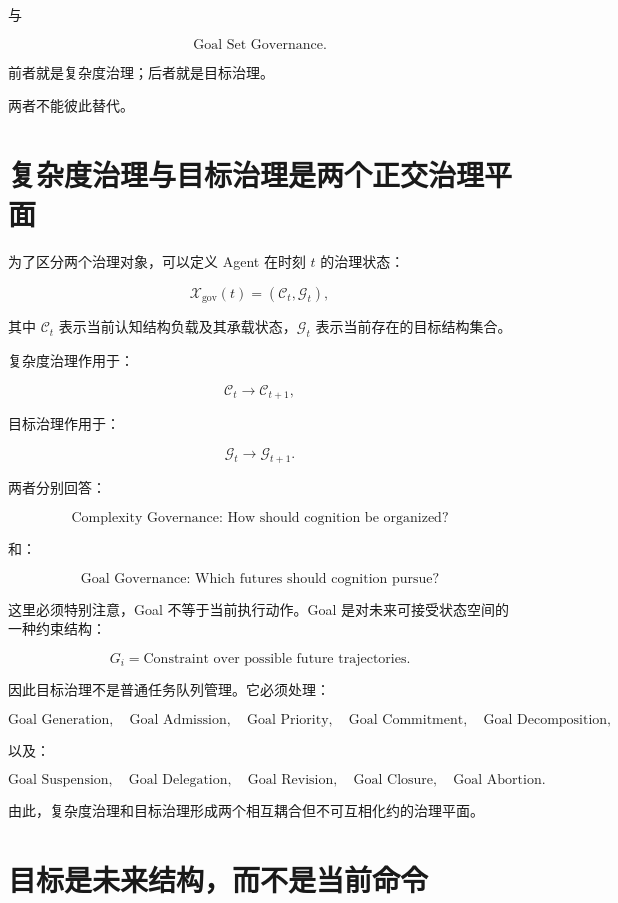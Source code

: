 与

\[
\boxed{
\text{Goal Set Governance}.
}
\]

前者就是复杂度治理；后者就是目标治理。

两者不能彼此替代。


\section{复杂度治理与目标治理是两个正交治理平面}

为了区分两个治理对象，可以定义 Agent 在时刻 $t$ 的治理状态：

\[
\boxed{
\mathcal X_{\mathrm{gov}}(t)
=
\left(
\mathcal C_t,
\mathcal G_t
\right),
}
\]

其中 $\mathcal C_t$ 表示当前认知结构负载及其承载状态，$\mathcal G_t$ 表示当前存在的目标结构集合。

复杂度治理作用于：

\[
\mathcal C_t
\longrightarrow
\mathcal C_{t+1},
\]

目标治理作用于：

\[
\mathcal G_t
\longrightarrow
\mathcal G_{t+1}.
\]

两者分别回答：

\[
\boxed{
\text{Complexity Governance: How should cognition be organized?}
}
\]

和：

\[
\boxed{
\text{Goal Governance: Which futures should cognition pursue?}
}
\]

这里必须特别注意，Goal 不等于当前执行动作。Goal 是对未来可接受状态空间的一种约束结构：

\[
\boxed{
G_i
=
\text{Constraint over possible future trajectories}.
}
\]

因此目标治理不是普通任务队列管理。它必须处理：

\[
\text{Goal Generation},
\quad
\text{Goal Admission},
\quad
\text{Goal Priority},
\quad
\text{Goal Commitment},
\quad
\text{Goal Decomposition},
\]

以及：

\[
\text{Goal Suspension},
\quad
\text{Goal Delegation},
\quad
\text{Goal Revision},
\quad
\text{Goal Closure},
\quad
\text{Goal Abortion}.
\]

由此，复杂度治理和目标治理形成两个相互耦合但不可互相化约的治理平面。


\section{目标是未来结构，而不是当前命令}

